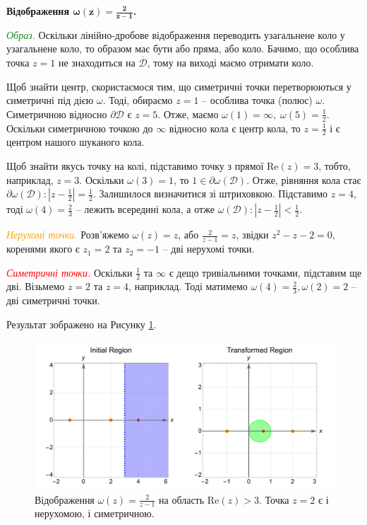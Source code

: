 \documentclass[oneside,solution]{karazin-complan-assign}
\begin{document}
\vspace{5px}
\textbf{Відображення $\boldsymbol{\omega(z)=\frac{2}{z-1}}$.} 

\textcolor{ForestGreen}{\textit{Образ.}} Оскільки лінійно-дробове відображення переводить узагальнене коло у узагальнене коло, то образом має бути або пряма, або коло. Бачимо, що особлива точка $z=1$ не знаходиться на $\overline{\mathcal{D}}$, тому на виході маємо отримати коло. 

Щоб знайти центр, скористаємося тим, що симетричні точки перетворюються у симетричні під дією $\omega$. Тоді, обираємо $z=1$ -- особлива точка (полюс) $\omega$. Симетричною відносно $\partial\mathcal{D}$ є $z=5$. Отже, маємо $\omega(1) = \infty, \; \omega(5) = \frac{1}{2}$. Оскільки симетричною точкою до $\infty$ відносно кола є центр кола, то $z=\frac{1}{2}$ і є центром нашого шуканого кола. 

Щоб знайти якусь точку на колі, підставимо точку з прямої $\text{Re}(z)=3$, тобто, наприклад, $z=3$. Оскільки $\omega(3) = 1$, то $1 \in \partial\omega(\mathcal{D})$. Отже, рівняння кола стає $\partial\omega(\mathcal{D}):|z-\frac{1}{2}| = \frac{1}{2}$. Залишилося визначитися зі штриховкою. Підставимо $z=4$, тоді $\omega(4) = \frac{2}{3}$ -- лежить всередині кола, а отже $\omega(\mathcal{D}): |z-\frac{1}{2}| < \frac{1}{2}$. 

\textcolor{orange}{\textit{Нерухомі точки.}} Розв'яжемо $\omega(z)=z$, або $\frac{2}{z-1} = z$, звідки $z^2 - z - 2 =0$, коренями якого є $z_1=2$ та $z_2=-1$ -- дві нерухомі точки.

\textcolor{red}{\textit{Симетричні точки.}} Оскільки $\frac{1}{2}$ та $\infty$ є дещо тривіальними точками, підставим ще дві. Візьмемо $z=2$ та $z=4$, наприклад. Тоді матимемо $\omega(4)=\frac{2}{3}, \omega(2) = 2$ -- дві симетричні точки.

Результат зображено на Рисунку \ref{fig:1(b)}.

\begin{figure}
    \centering
    \includegraphics[width=\textwidth]{images/hw_4/problem_1(b).pdf}
    \caption{Відображення $\omega(z)=\frac{2}{z-1}$ на область $\text{Re}(z)>3$. Точка $z=2$ є і нерухомою, і симетричною.}
    \label{fig:1(b)}
\end{figure}
\end{document}
